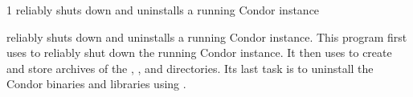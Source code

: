 \begin{ManPage}{\label{man-condor-cold-stop}}{1}
{reliably shuts down and uninstalls a running Condor instance}

\Synopsis {}


\Description 
{} reliably shuts down and uninstalls a
running Condor instance.  
This program first uses  to
reliably shut down the running Condor instance.
It then uses  to create and store archives of the
, , and  directories.
Its last task is to 
uninstall the Condor binaries and libraries using .


\end{ManPage}
